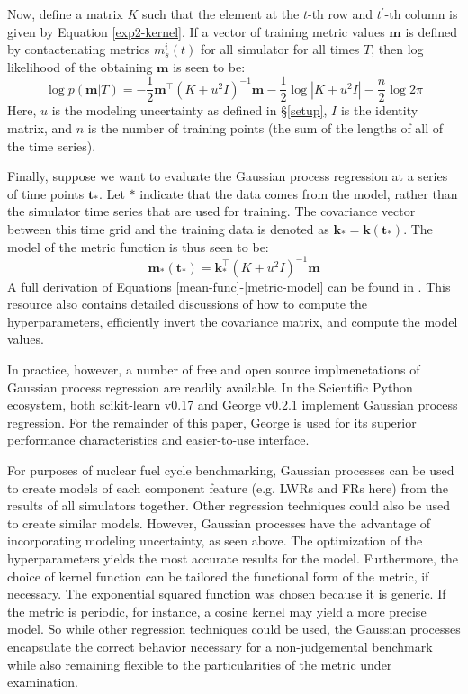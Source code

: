 Now, define a matrix $K$ such that the element at the $t$-th row and $t^\prime$-th
column is given by Equation \ref{exp2-kernel}. If a vector of training metric 
values $\mathbf{m}$ is defined by contactenating metrics $m_s^i(t)$ for all simulator
for all times $T$, then log likelihood of the obtaining $\mathbf{m}$ 
is seen to be:
\begin{equation}
\label{log-p}
\log p(\mathbf{m}|T) = -\frac{1}{2}\mathbf{m}^\top\left(K + u^2I\right)^{-1}\mathbf{m}
                       -\frac{1}{2}\log\left|K + u^2I\right|
                       -\frac{n}{2}\log 2\pi
\end{equation}
Here, $u$ is the modeling uncertainty as defined in \S\ref{setup}, $I$ is the
identity matrix, and $n$ is the number of training points (the sum of the lengths 
of all of the time series).

Finally, suppose we want to evaluate the Gaussian process regression at a 
series of time points $\mathbf{t_*}$. Let $*$ indicate that the data comes from 
the model, rather than the simulator time series that are used for training. 
The covariance vector between this time grid and the training data is denoted
as $\mathbf{k}_* = \mathbf{k}(\mathbf{t_*})$. The model of the metric function is 
thus seen to be:
\begin{equation}
\label{metric-model}
\mathbf{m}_*(\mathbf{t}_*) = \mathbf{k}_*^\top \left(K + u^2I\right)^{-1}\mathbf{m}
\end{equation}
A full derivation of Equations \ref{mean-func}-\ref{metric-model} can be found in 
\cite{rasmussen2006gaussian}. This resource also contains detailed discussions of 
how to compute the hyperparameters, efficiently invert the covariance matrix, 
and compute the model values. 

In practice, however, a number of free and open source implmenetations of Gaussian 
process regression are readily available. In the Scientific Python ecosystem, both 
scikit-learn v0.17 \cite{scikit-learn} and George v0.2.1 \cite{hodlr} implement 
Gaussian process regression. For the remainder of this paper, George is used
for its superior performance characteristics and easier-to-use interface.

For purposes of nuclear fuel cycle benchmarking, Gaussian processes can be used to
create models of each component feature (e.g. LWRs and FRs here) from the 
results of all simulators together. Other regression techniques could also be used 
to create similar models.  However, Gaussian processes have the advantage of 
incorporating modeling uncertainty, as seen above. The optimization of the 
hyperparameters yields the most accurate results for the model. Furthermore, the 
choice of kernel function can be tailored the functional form of the metric, if 
necessary. The exponential squared function was chosen because it is generic. If the 
metric is periodic, for instance, a cosine kernel may yield a more precise model. 
So while other regression techniques could be used, the Gaussian processes 
encapsulate the correct behavior necessary for a non-judgemental benchmark while 
also remaining flexible to the particularities of the metric under examination.

